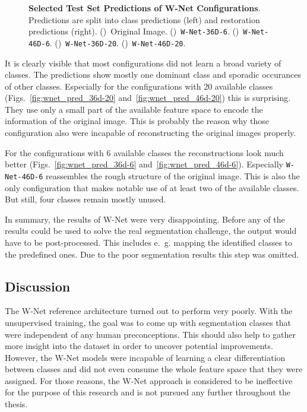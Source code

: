 \begin{figure}[h]
    \caption[Selected Test Set Predictions of W-Net Configurations]
    {\textbf{Selected Test Set Predictions of W-Net Configurations}. Predictions are split into class predictions (left) and restoration predictions (right).
    ()~Original Image.
    ()~\texttt{W-Net-36D-6}.
    ()~\texttt{W-Net-46D-6}.
    ()~\texttt{W-Net-36D-20}.
    ()~\texttt{W-Net-46D-20}.}
    \label{fig:wnet_prediction_images}
\end{figure}

It is clearly visible that most configurations did not learn a broad variety of classes. The predictions show mostly one dominant class and sporadic occurances of other classes. Especially for the configurations with 20 available classes (Figs.~\ref{fig:wnet_pred_36d-20} and~\ref{fig:wnet_pred_46d-20}) this is surprising. They use only a small part of the available feature space to encode the information of the original image. This is probably the reason why those configuration also were incapable of reconstructing the original images properly.

For the configurations with 6 available classes the reconstructions look much better (Figs.~\ref{fig:wnet_pred_36d-6} and~\ref{fig:wnet_pred_46d-6}). Especially \texttt{W-Net-46D-6} reassembles the rough structure of the original image. This is also the only configuration that makes notable use of at least two of the available classes. But still, four classes remain mostly unused.

In summary, the results of W-Net were very disappointing. Before any of the results could be used to solve the real segmentation challenge, the output would have to be post-processed. This includes e.~g. mapping the identified classes to the predefined ones. Due to the poor segmentation results this step was omitted.

\subsection{Discussion}
\label{sec:segmentation_discussion}
The W-Net reference architecture turned out to perform very poorly. With the unsupervised training, the goal was to come up with segmentation classes that were independent of any human preconceptions. This should also help to gather more insight into the dataset in order to uncover potential improvements. However, the W-Net models were incapable of learning a clear differentiation between classes and did not even consume the whole feature space that they were assigned. For those reasons, the W-Net approach is considered to be ineffective for the purpose of this research and is not pursued any further throughout the thesis.

